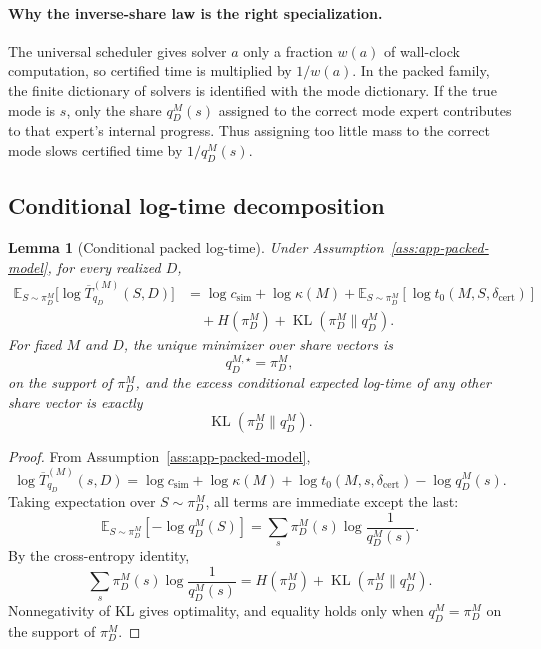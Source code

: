 \documentclass{article}
\newtheorem{lemma}{Lemma}
\DeclareMathOperator{\KL}{KL}
\newcommand{\E}{\mathbb{E}}
\begin{document}
\paragraph{Why the inverse-share law is the right specialization.}
The universal scheduler gives solver \(a\) only a fraction \(w(a)\) of wall-clock computation,
so certified time is multiplied by \(1/w(a)\).
In the packed family, the finite dictionary of solvers is identified with the mode dictionary.
If the true mode is \(s\), only the share \(q_D^M(s)\) assigned to the correct mode expert
contributes to that expert's internal progress.
Thus assigning too little mass to the correct mode slows certified time by \(1/q_D^M(s)\).

\subsection{Conditional log-time decomposition}

\begin{lemma}[Conditional packed log-time]
\label{lem:app-conditional-packed}
Under Assumption~\ref{ass:app-packed-model}, for every realized \(D\),
\[
\begin{aligned}
    \E_{S\sim\pi_D^M}
    \bigl[
        \log \overline T^{(M)}_{q_D}(S,D)
    \bigr]
    &=
    \log c_{\mathrm{sim}}
    +
    \log\kappa(M)
    +
    \E_{S\sim\pi_D^M}
    [\log t_0(M,S,\delta_{\mathrm{cert}})]
    \\
    &\quad
    +
    H(\pi_D^M)
    +
    \KL(\pi_D^M\|q_D^M).
\end{aligned}
\]
For fixed \(M\) and \(D\), the unique minimizer over share vectors is
\[
    q_D^{M,\star}=\pi_D^M,
\]
on the support of \(\pi_D^M\), and the excess conditional expected log-time of any other
share vector is exactly
\[
    \KL(\pi_D^M\|q_D^M).
\]
\end{lemma}

\begin{proof}
From Assumption~\ref{ass:app-packed-model},
\[
    \log \overline T^{(M)}_{q_D}(s,D)
    =
    \log c_{\mathrm{sim}}
    +
    \log \kappa(M)
    +
    \log t_0(M,s,\delta_{\mathrm{cert}})
    -
    \log q_D^M(s).
\]
Taking expectation over \(S\sim\pi_D^M\), all terms are immediate except the last:
\[
    \E_{S\sim\pi_D^M}[-\log q_D^M(S)]
    =
    \sum_s \pi_D^M(s)\log\frac{1}{q_D^M(s)}.
\]
By the cross-entropy identity,
\[
    \sum_s \pi_D^M(s)\log\frac{1}{q_D^M(s)}
    =
    H(\pi_D^M)+\KL(\pi_D^M\|q_D^M).
\]
Nonnegativity of KL gives optimality, and equality holds only when
\(q_D^M=\pi_D^M\) on the support of \(\pi_D^M\).
\end{proof}
\end{document}
